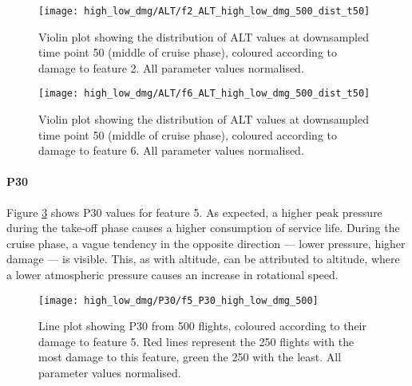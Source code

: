 \begin{figure}
    \centering
    \texttt{[image: high\_low\_dmg/ALT/f2\_ALT\_high\_low\_dmg\_500\_dist\_t50]}
    \caption{\label{fig:dmg_violin_ALT_f2} Violin plot showing the distribution of ALT values at downsampled time point 50 (middle of cruise phase), coloured according to damage to feature 2. All parameter values normalised.}
\end{figure}

\begin{figure}
    \centering
    \texttt{[image: high\_low\_dmg/ALT/f6\_ALT\_high\_low\_dmg\_500\_dist\_t50]}
    \caption{\label{fig:dmg_violin_ALT_f6} Violin plot showing the distribution of ALT values at downsampled time point 50 (middle of cruise phase), coloured according to damage to feature 6. All parameter values normalised.}
\end{figure}

\paragraph{P30}
Figure \ref{fig:high_low_dmg_P30} shows P30 values for feature 5. As expected, a higher peak pressure during the take-off phase causes a higher consumption of service life. During the cruise phase, a vague tendency in the opposite direction --- lower pressure, higher damage --- is visible. This, as with altitude, can be attributed to altitude, where a lower atmospheric pressure causes an increase in rotational speed.

\begin{figure}
    \centering
    \texttt{[image: high\_low\_dmg/P30/f5\_P30\_high\_low\_dmg\_500]}
    \caption{\label{fig:high_low_dmg_P30} Line plot showing P30 from 500 flights, coloured according to their damage to feature 5. Red lines represent the 250 flights with the most damage to this feature, green the 250 with the least. All parameter values normalised.}
\end{figure}



